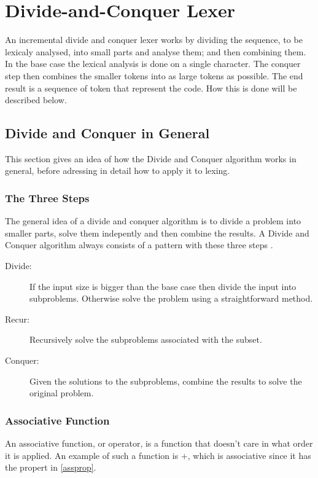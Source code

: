 \chapter{Divide-and-Conquer Lexer}
An incremental divide and conquer lexer works by dividing the sequence, to be lexicaly analysed,
into small parts and analyse them; and then combining them. In the base
case the lexical analysis is done on a single character. The conquer step
then combines the smaller tokens into as large tokens as possible. The end
result is a sequence of token that represent the code. How this is done
will be described below.

\section{Divide and Conquer in General}
This section gives an idea of how the Divide and Conquer algorithm
works in general, before adressing in detail how to apply it to lexing.

\subsection{The Three Steps}
The general idea of a divide and conquer algorithm is to divide a problem into
smaller parts, solve them indepently and then combine the results. A Divide
and Conquer algorithm always consists of a pattern with these three steps \cite{Goodrich}.
\begin{description}
\item[Divide:] If the input size is bigger than the base case then divide the
input into subproblems. Otherwise solve the problem using a straightforward
method.
\item[Recur:] Recursively solve the subproblems associated with the subset.
\item[Conquer:] Given the solutions to the subproblems, combine the results to
solve the original problem.
\end{description}

\subsection{Associative Function}
An associative function, or operator, is a function that doesn't care in what
order it is applied. An example of such a function is $+$, which is associative
since it has the propert in \cref{assprop}.

